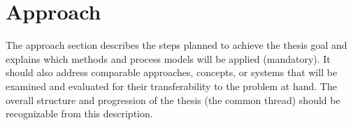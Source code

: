 \section*{Approach}
\label{sec:approach}

The approach section describes the steps planned to achieve the thesis goal and explains which methods and process models will be applied (mandatory).
It should also address comparable approaches, concepts, or systems that will be examined and evaluated for their transferability to the problem at hand.
The overall structure and progression of the thesis (the common thread) should be recognizable from this description.

\blindtext
